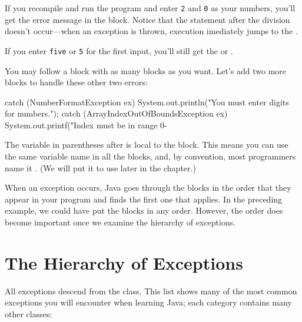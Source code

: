 If you recompile and run the program and enter {\tt 2} and {\tt 0} as your numbers, you'll get the error message in the  block. Notice that the  statement after the division doesn't occur---when an exception is thrown, execution imediately jumps to the .

If you enter {\tt five} or {\tt 5} for the first input, you'll still get the  or .
 
You may follow a  block with as many  blocks as you want. Let's add two more  blocks to handle these other two errors:

\begin{code}
catch (NumberFormatException ex) {
    System.out.println("You must enter digits for numbers.");
}
catch (ArrayIndexOutOfBoundsException ex) {
    System.out.printf("Index must be in range 0-%
}
\end{code}

The variable in parentheses after  is local to the  block. This means you can use the same variable name in all the  blocks, and, by convention, most programmers name it . (We will put it to use later in the chapter.)

When an exception occurs, Java goes through the  blocks in the order that they appear in your program and finds the first one that applies. In the preceding example, we could have put the  blocks in any order. However, the order does become important once we examine the hierarchy of exceptions.

\section{The Hierarchy of Exceptions}

All exceptions descend from the  class\footnotemark. This list shows many of the most common exceptions you will encounter when learning Java; each category contains many other classes:



